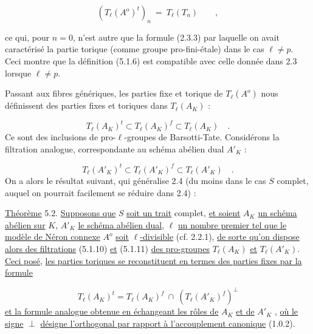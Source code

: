 \begin{equation}\tag{5.1.9}
(T_\ell(A^{\mathrm{o}})^t)_n \ = \ T_\ell(T_n) \qquad ,
\end{equation}


ce qui, pour $n=0$, n'est autre que la formule (2.3.3) par laquelle on avait caractérisé la partie torique (comme groupe pro-fini-étale) dans le cas $\ell \neq p$. Ceci montre que la définition (5.1.6) est compatible avec celle donnée dans 2.3 lorsque $\ell \neq p$.

Passant aux fibres génériques, les parties fixe et torique de $T_\ell(A^o)$ nous définissent des parties fixes et toriques dans $T_\ell(A_K)$ :

\begin{equation}\tag{5.1.10}
T_\ell(A_K)^t \subset T_\ell(A_K)^f \subset T_\ell(A_K) \quad .
\end{equation}
Ce sont des inclusions de pro-$\ell$-groupes de Barsotti-Tate. Considérons la filtration analogue, correspondante au schéma abélien dual $A'_K$ :

\begin{equation}\tag{5.1.11}
T_\ell(A'_K)^t \subset T_\ell(A'_K)^f \subset T_\ell(A'_K) \quad .
\end{equation}
On a alors le résultat suivant, qui généralise 2.4 (du moins dans le cas $S$ complet, auquel on pourrait facilement se réduire dans 2.4) :

\underline{Théorème} 5.2. \underline{Supposons que} $S$ \underline{soit un trait} complet, \underline{et soient} $A_K$ \underline{un schéma abélien sur} $K$, $A'_K$ \underline{le schéma abélien dual}, $\ell$ \underline{un nombre premier tel que le modèle de Néron connexe} $A^o$ \underline{soit} $\ell$\underline{-divisible} (cf. 2.2.1), \underline{de sorte qu'on dispose alors des filtrations} (5.1.10) \underline{et} (5.1.11) \underline{des pro-groupes} $T_\ell(A_K)$ \underline{et} $T_\ell(A'_K)$. \underline{Ceci posé}, \underline{les parties toriques se reconstituent en termes des parties fixes par la formule}

\begin{equation}\tag{5.2.1}
T_\ell(A_K)^t = T_\ell(A_K)^f \ \cap \ (T_\ell(A'_K)^f)^\perp
\end{equation}
\underline{et la formule analogue obtenue en échangeant les rôles de} $A_K$ \underline{et de} $A'_K$ , \underline{où le signe} $\perp$ \underline{désigne l'orthogonal par rapport à l'accouplement canonique} (1.0.2).


